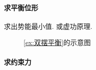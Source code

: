 \documentclass[../LectureNotes.tex]{subfiles}
\begin{document}
\paragraph{求平衡位形} %
\label{par:求平衡位形}

求出势能最小值. 或虚功原理.


\begin{figure}[ht]
    \centering
    \caption{\cref{ex:双摆平衡}的示意图}
    \label{fig:双摆平衡的示意图}
\end{figure}

\paragraph{求约束力} %
\label{par:求约束力}
\end{document}
